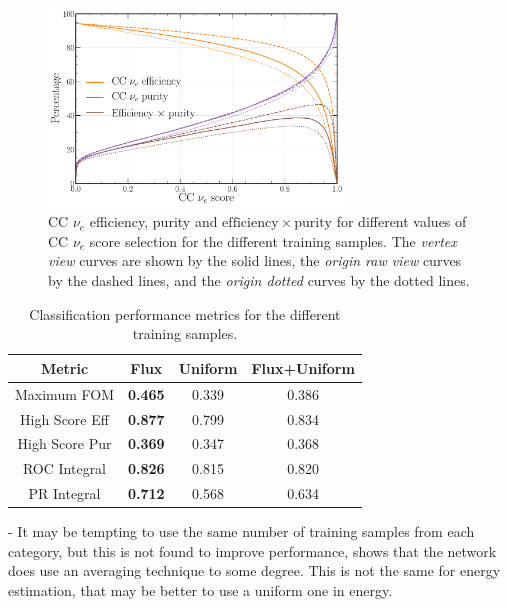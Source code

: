 \begin{figure} %
    \includegraphics[width=0.7\textwidth]{diagrams/7-results/sample_nuel_eff_curves.pdf}
    \caption[CC $\nu_{e}$ efficiency and purity curves for different training samples]
    {CC $\nu_{e}$ efficiency, purity and $\mathrm{efficiency}\times\mathrm{purity}$ for different
        values of CC $\nu_{e}$ score selection for the different training samples. The
        \emph{vertex view} curves are shown by the solid lines, the \emph{origin raw view} curves
        by the dashed lines, and the \emph{origin dotted} curves by the dotted lines.}
    \label{fig:sample_nuel_eff_curves}
\end{figure}

\begin{table} %
    \begin{tabular}{cccc}
        Metric         & Flux           & Uniform & Flux+Uniform \\
        \midrule
        Maximum FOM    & \textbf{0.465} & 0.339   & 0.386        \\
        High Score Eff & \textbf{0.877} & 0.799   & 0.834        \\
        High Score Pur & \textbf{0.369} & 0.347   & 0.368        \\
        ROC Integral   & \textbf{0.826} & 0.815   & 0.820        \\
        PR Integral    & \textbf{0.712} & 0.568   & 0.634        \\
    \end{tabular}
    \caption[Classification performance metrics for different training samples]
    {Classification performance metrics for the different training samples.}
    \label{tab:sample}
\end{table}

- It may be tempting to use the same number of training samples from each category, but this is
not found to improve performance, shows that the network does use an averaging technique to some
degree. This is not the same for energy estimation, that may be better to use a uniform one in
energy.

